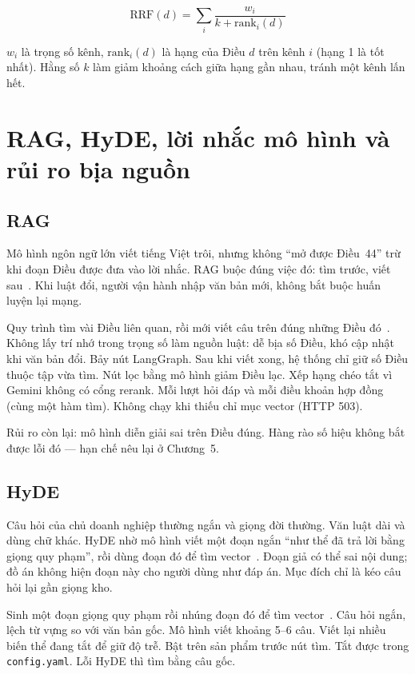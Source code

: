 \begin{equation}
\label{eq:rrf}
\mathrm{RRF}(d) = \sum_{i} \frac{w_i}{k + \mathrm{rank}_i(d)}
\end{equation}

$w_i$ là trọng số kênh, $\mathrm{rank}_i(d)$ là hạng của Điều $d$ trên kênh $i$
(hạng 1 là tốt nhất). Hằng số $k$ làm giảm khoảng cách giữa hạng gần nhau, tránh
một kênh lấn hết.

\section{RAG, HyDE, lời nhắc mô hình và rủi ro bịa nguồn}

\subsection{RAG}

Mô hình ngôn ngữ lớn viết tiếng Việt trôi, nhưng không ``mở được Điều~44'' trừ
khi đoạn Điều được đưa vào lời nhắc. RAG buộc đúng việc đó: tìm trước, viết
sau~\cite{lewis2020rag}. Khi luật đổi, người vận hành nhập văn bản mới, không
bắt buộc huấn luyện lại mạng.

\boncau
{Quy trình tìm vài Điều liên quan, rồi mới viết câu trên đúng những Điều
đó~\cite{lewis2020rag}.}
{Không lấy trí nhớ trong trọng số làm nguồn luật: dễ bịa số Điều, khó cập nhật
khi văn bản đổi.}
{Bảy nút LangGraph. Sau khi viết xong, hệ thống chỉ giữ số Điều thuộc tập vừa
tìm. Nút lọc bằng mô hình giảm Điều lạc. Xếp hạng chéo tắt vì Gemini không có
cổng rerank.}
{Mỗi lượt hỏi đáp và mỗi điều khoản hợp đồng (cùng một hàm tìm). Không chạy khi
thiếu chỉ mục vector (HTTP 503).}

Rủi ro còn lại: mô hình diễn giải sai trên Điều đúng. Hàng rào số hiệu không
bắt được lỗi đó --- hạn chế nêu lại ở Chương~5.

\subsection{HyDE}

Câu hỏi của chủ doanh nghiệp thường ngắn và giọng đời thường. Văn luật dài và
dùng chữ khác. HyDE nhờ mô hình viết một đoạn ngắn ``như thể đã trả lời bằng
giọng quy phạm'', rồi dùng đoạn đó để tìm vector~\cite{gao2023hyde}. Đoạn giả
có thể sai nội dung; đồ án không hiện đoạn này cho người dùng như đáp án. Mục
đích chỉ là kéo câu hỏi lại gần giọng kho.

\boncau
{Sinh một đoạn giọng quy phạm rồi nhúng đoạn đó để tìm vector~\cite{gao2023hyde}.}
{Câu hỏi ngắn, lệch từ vựng so với văn bản gốc.}
{Mô hình viết khoảng 5--6 câu. Viết lại nhiều biến thể đang tắt để giữ độ trễ.}
{Bật trên sản phẩm trước nút tìm. Tắt được trong \texttt{config.yaml}. Lỗi HyDE
thì tìm bằng câu gốc.}

